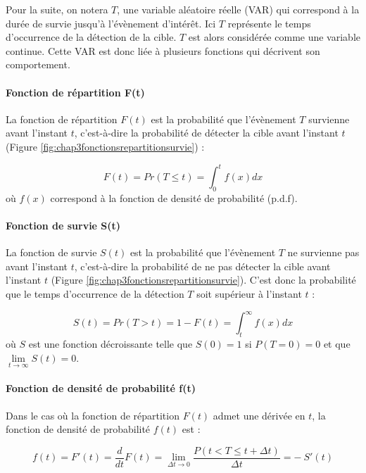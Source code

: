 Pour la suite, on notera $T$, une variable aléatoire réelle (VAR) qui correspond à la durée de survie jusqu'à l'évènement d'intérêt. 
Ici $T$ représente le temps d'occurrence de la détection de la cible. 
$T$ est alors considérée comme une variable continue. 
Cette VAR est donc liée à plusieurs fonctions qui décrivent son comportement. 

\paragraph{Fonction de répartition F(t)\\}
La fonction de répartition $F(t)$ est la probabilité que l'évènement $T$ survienne avant l'instant $t$, c'est-à-dire la probabilité de détecter la cible avant l'instant $t$ (Figure \ref{fig:chap3fonctionsrepartitionsurvie}) :

\begin{equation}
F(t) = Pr(T \leq t) = \int_0^t f(x) dx
\end{equation}
où $f(x)$ correspond à la fonction de densité de probabilité (p.d.f).

\paragraph{Fonction de survie S(t)\\}
La fonction de survie $S(t)$ est la probabilité que l'évènement $T$ ne survienne pas avant l'instant $t$, c'est-à-dire la probabilité de ne pas détecter la cible avant l'instant $t$ (Figure \ref{fig:chap3fonctionsrepartitionsurvie}). 
C'est donc la probabilité que le temps d'occurrence de la détection $T$ soit supérieur à l'instant $t$ :

\begin{equation}
S(t) = Pr(T > t) = 1 - F(t) = \int_t^{\infty} f(x) dx
\end{equation}
où $S$ est une fonction décroissante telle que $S(0)=1$ si $P(T=0)=0$ et que $\lim\limits_{t \to \infty} S(t) = 0$.

\paragraph{Fonction de densité de probabilité f(t)\\}
Dans le cas où la fonction de répartition $F(t)$ admet une dérivée en $t$, la fonction de densité de probabilité $f(t)$ est :

\begin{equation}
f(t) = F'(t) = \frac{d}{dt} F(t) = \lim\limits_{\Delta t \to 0} \frac{P(t < T \leq t + \Delta t)}{\Delta t} = -~S'(t)
\end{equation}

